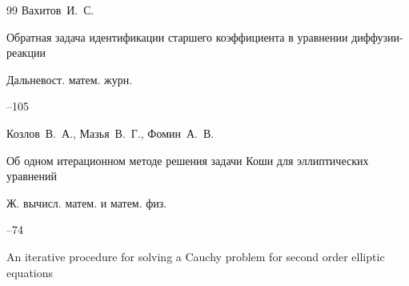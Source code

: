 \begin{thebibliography}{99}
\by Вахитов~И.~С.

\paper Обратная задача идентификации старшего коэффициента в уравнении диффузии-реакции

\jour Дальневост. матем. журн.




--105








\by Козлов~В.~А., Мазья~В.~Г., Фомин~А.~В.

\paper Об одном итерационном методе решения задачи Коши для эллиптических уравнений

\jour Ж. вычисл. матем. и матем. физ.




--74


















\paper An iterative procedure for solving a Cauchy problem for second order elliptic equations


\end{thebibliography}
